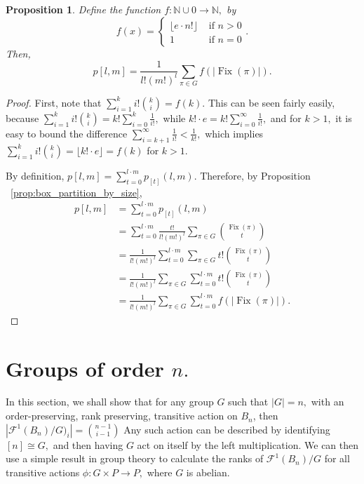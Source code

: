 \documentclass{amsart}
\newtheorem{prop}[thm]{Proposition}
\theoremstyle{remark}
\newcommand\BN{{\mathbb N}}
\def\Fix{\operatorname{Fix}}
\begin{document}
\begin{prop}
\label{prop:all_box_partitions}
Define the function $f:\BN \cup 0 \rightarrow \BN,$ by $$f(x) = \begin{cases} \lfloor e\cdot n!\rfloor &\text{ if } n > 0 \\ 1 &\text{ if } n = 0\end{cases}.$$
Then, $$p[l,m] = \frac 1 {l!(m!)^l}\sum_{\pi \in G} f(|\Fix(\pi)|).$$
\end{prop}
\begin{proof}
First, note that $\sum_{i=1}^k i! \binom k i = f(k).$ This can be seen fairly easily, because $\sum_{i=1}^k i! \binom k i = k!\sum_{i=0}^k \frac 1 {i!},$ while $k! \cdot e = k!\sum_{i=0}^\infty \frac 1 {i!},$ and for $k > 1,$ it is easy to bound the difference $\sum_{i=k+1}^\infty \frac 1 {i!} < \frac 1 {k!},$ which implies   $\sum_{i=1}^k i! \binom k i  = \lfloor k! \cdot e \rfloor = f(k)$ for $k > 1.$

By definition, $p[l,m] = \sum_{t = 0}^{l\cdot m} p_{[t]}(l,m)$. Therefore, by Proposition ~\ref{prop:box_partition_by_size},
\begin{align*}
p[l,m] &= \sum_{t = 0}^{l\cdot m} p_{[t]}(l,m)\\
&=\sum_{t = 0}^{l\cdot m}\frac {t!}{l!(m!)^l}\sum_{\pi \in G} \binom {\Fix(\pi)} t\\
&= \frac {1}{l!(m!)^l}\sum_{t = 0}^{l\cdot m}\sum_{\pi \in G} t!\binom {\Fix(\pi)} t\\
&=  \frac {1}{l!(m!)^l}\sum_{\pi \in G}\sum_{t = 0}^{l\cdot m} t!\binom {\Fix(\pi)} t\\
&= \frac {1}{l!(m!)^l}\sum_{\pi \in G}\sum_{t = 0}^{l\cdot m} f(|\Fix(\pi)|).
\end{align*}
\end{proof}

\section{Groups of order $n.$}

In this section, we shall show that for any group $G$ such that $|G| = n,$ with an order-preserving, rank preserving, transitive action on $B_n$, then $|\mathcal F^1(B_n)/G)_i| = \binom {n-1}{i-1}$ Any such action can be described by identifying $[n] \cong G,$ and then having $G$ act on itself by the left multiplication. We can then use a simple result in group theory to calculate the ranks of $\mathcal F^1(B_n)/G$ for all transitive actions $\phi:G\times P \rightarrow P,$ where $G$ is abelian.
\end{document}
